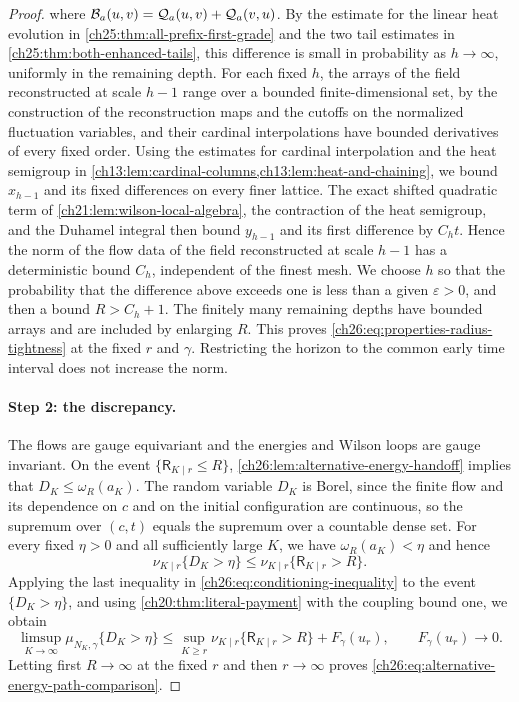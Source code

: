 \begin{proof}
where $\mathcal B_{a}(u,v)=\mathcal Q_{a}(u,v)+\mathcal Q_{a}(v,u)$. By the estimate for the linear heat evolution in \cref{ch25:thm:all-prefix-first-grade} and the two tail estimates in \cref{ch25:thm:both-enhanced-tails}, this difference is small in probability as $h\to\infty$, uniformly in the remaining depth. For each fixed $h$, the arrays of the field reconstructed at scale $h-1$ range over a bounded finite-dimensional set, by the construction of the reconstruction maps and the cutoffs on the normalized fluctuation variables, and their cardinal interpolations have bounded derivatives of every fixed order. Using the estimates for cardinal interpolation and the heat semigroup in \cref{ch13:lem:cardinal-columns,ch13:lem:heat-and-chaining}, we bound $x_{h-1}$ and its fixed differences on every finer lattice. The exact shifted quadratic term of \cref{ch21:lem:wilson-local-algebra}, the contraction of the heat semigroup, and the Duhamel integral then bound $y_{h-1}$ and its first difference by $C_ht$. Hence the norm of the flow data of the field reconstructed at scale $h-1$ has a deterministic bound $C_h$, independent of the finest mesh. We choose $h$ so that the probability that the difference above exceeds one is less than a given $\varepsilon>0$, and then a bound $R>C_h+1$. The finitely many remaining depths have bounded arrays and are included by enlarging $R$. This proves \eqref{ch26:eq:properties-radius-tightness} at the fixed $r$ and $\gamma$. Restricting the horizon to the common early time interval does not increase the norm.

\paragraph{Step 2: the discrepancy.}
The flows are gauge equivariant and the energies and Wilson loops are gauge invariant. On the event $\{\mathsf R_{K\mid r}\le R\}$, \cref{ch26:lem:alternative-energy-handoff} implies that $D_K\le\omega_R(a_K)$. The random variable $D_K$ is Borel, since the finite flow and its dependence on $c$ and on the initial configuration are continuous, so the supremum over $(c,t)$ equals the supremum over a countable dense set. For every fixed $\eta>0$ and all sufficiently large $K$, we have $\omega_R(a_K)<\eta$ and hence
\[
 \nu_{K\mid r}\{D_K>\eta\}\le\nu_{K\mid r}\{\mathsf R_{K\mid r}>R\}.
\]
Applying the last inequality in \eqref{ch26:eq:conditioning-inequality} to the event $\{D_K>\eta\}$, and using \cref{ch20:thm:literal-payment} with the coupling bound one, we obtain
\[
 \limsup_{K\to\infty}\mu_{N_K,\gamma}\{D_K>\eta\}\le\sup_{K\ge r}\nu_{K\mid r}\{\mathsf R_{K\mid r}>R\}+F_\gamma(u_r),\qquad F_\gamma(u_r)\longrightarrow0.
\]
Letting first $R\to\infty$ at the fixed $r$ and then $r\to\infty$ proves \eqref{ch26:eq:alternative-energy-path-comparison}.


\end{proof}
